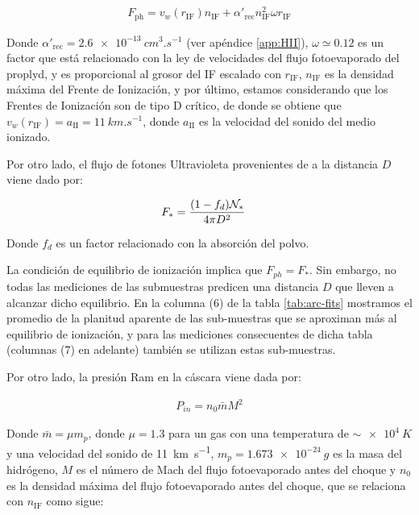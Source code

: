 \begin{align}
  F_{\mathrm{ph}} = v_w(r_{\mathrm{IF}}) n_{\mathrm{IF}} + \alpha'_{\mathrm{rec}}n^2_{\mathrm{IF}} \omega r_{\mathrm{IF}}\label{eq:F-ph}
\end{align}

Donde $\alpha'_{\mathrm{rec}} = \SI{2.6e-13}{cm^3.s^{-1}}$ (ver apéndice \ref{app:HII}), $\omega \simeq 0.12$ es un factor que está relacionado con la ley de velocidades del flujo fotoevaporado del proplyd, y es proporcional al grosor del IF escalado con $r_{\mathrm{IF}}$, $n_{\mathrm{IF}}$ es la densidad máxima del Frente de Ionización, y por último, estamos considerando que los Frentes de Ionización son de tipo D crítico, de donde se obtiene que $v_w(r_{\mathrm{IF}}) = a_{\mathrm{II}} = \SI{11}{km.s^{-1}}$, donde $a_{\mathrm{II}}$ es la velocidad del sonido del medio ionizado.

Por otro lado, el flujo de fotones Ultravioleta provenientes de \thC{} a la distancia $D$ viene dado por:

\begin{align}
   F_* &= \frac{(1-f_d)\mathcal{N}_*}{4\pi D^2} \label{eq:F-star} 
\end{align}

Donde $f_d$ es un factor relacionado con la absorción del polvo.

La condición de equilibrio de ionización implica que $F_{ph} = F_*$. Sin embargo, no todas las mediciones de las submuestras predicen una distancia $D$ que lleven a alcanzar dicho equilibrio. En la columna (6) de la tabla \ref{tab:arc-fits} mostramos el promedio de la planitud aparente de las sub-muestras que se aproximan más al equilibrio de ionización, y para las mediciones consecuentes de dicha tabla (columnas (7) en adelante) también se utilizan estas sub-muestras.

Por otro lado, la presión Ram en la cáscara viene dada por:

\begin{align}
  P_{in} = n_0\bar{m}M^2 \label{eq:P-in}
\end{align}

Donde $\bar{m} = \mu m_p$, donde $\mu = 1.3$ para un gas con una temperatura de $\sim \SI{e4}{K}$ y una velocidad del sonido de \SI{11}{km.s^{-1}}, $m_p = \SI{1.673e-24}{g}$ es la masa del hidrógeno, $M$ es el número de Mach del flujo fotoevaporado antes del choque y $n_0$ es la densidad máxima del flujo fotoevaporado antes del choque, que se relaciona con $n_{\mathrm{IF}}$ como sigue:

